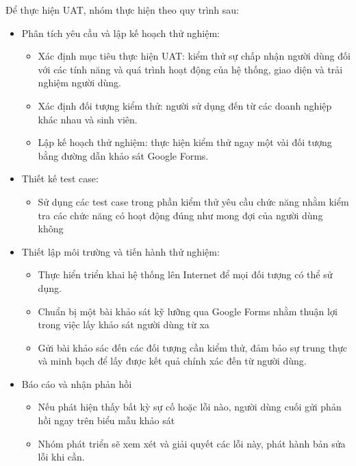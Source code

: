 Để thực hiện UAT, nhóm thực hiện theo quy trình sau:
\begin{itemize}
    \item Phân tích yêu cầu và lập kế hoạch thử nghiệm:
    \begin{itemize}
        \item Xác định mục tiêu thực hiện UAT: kiểm thử sự chấp nhận người dùng đối với các tính năng và quá trình hoạt động của hệ thống, giao diện và trải nghiệm người dùng.
        \item Xác định đối tượng kiểm thử: người sử dụng đến từ các doanh nghiệp khác nhau và sinh viên.
        \item Lập kế hoạch thử nghiệm: thực hiện kiểm thử ngay một vài đối tượng bằng đường dẫn khảo sát Google Forms.
    \end{itemize}
    \item Thiết kế test case:
    \begin{itemize}
        \item Sử dụng các test case trong phần kiểm thử yêu cầu chức năng nhằm kiểm tra các chức năng có hoạt động đúng như mong đợi của người dùng không
    \end{itemize}
    \item Thiết lập môi trường và tiến hành thử nghiệm:
    \begin{itemize}
        \item Thực hiển triển khai hệ thống lên Internet để mọi đối tượng có thể sử dụng.
        \item Chuẩn bị một bài khảo sát kỹ lưỡng qua Google Forms nhằm thuận lợi trong việc lấy khảo sát người dùng từ xa
        \item Gửi bài khảo sác đến các đối tượng cần kiểm thử, đảm bảo sự trung thực và minh bạch để lấy được kết quả chính xác đến từ người dùng.
    \end{itemize}
    \item Báo cáo và nhận phản hồi
    \begin{itemize}
        \item Nếu phát hiện thấy bất kỳ sự cố hoặc lỗi nào, người dùng cuối gửi phản hồi ngay trên biểu mẫu khảo sát
        \item Nhóm phát triển sẽ xem xét và giải quyết các lỗi này, phát hành bản sửa lỗi khi cần.
    \end{itemize}
\end{itemize}

